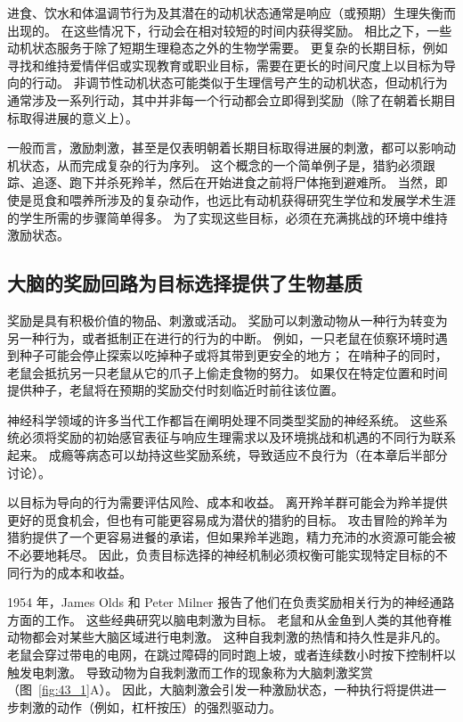 进食、饮水和体温调节行为及其潜在的动机状态通常是响应（或预期）生理失衡而出现的。
在这些情况下，行动会在相对较短的时间内获得奖励。
相比之下，一些动机状态服务于除了短期生理稳态之外的生物学需要。
更复杂的长期目标，例如寻找和维持爱情伴侣或实现教育或职业目标，需要在更长的时间尺度上以目标为导向的行动。
非调节性动机状态可能类似于生理信号产生的动机状态，但动机行为通常涉及一系列行动，其中并非每一个行动都会立即得到奖励（除了在朝着长期目标取得进展的意义上）。


一般而言，激励刺激，甚至是仅表明朝着长期目标取得进展的刺激，都可以影响动机状态，从而完成复杂的行为序列。
这个概念的一个简单例子是，猎豹必须跟踪、追逐、跑下并杀死羚羊，然后在开始进食之前将尸体拖到避难所。
当然，即使是觅食和喂养所涉及的复杂动作，也远比有动机获得研究生学位和发展学术生涯的学生所需的步骤简单得多。
为了实现这些目标，必须在充满挑战的环境中维持激励状态。



\subsection{大脑的奖励回路为目标选择提供了生物基质}

奖励是具有积极价值的物品、刺激或活动。
奖励可以刺激动物从一种行为转变为另一种行为，或者抵制正在进行的行为的中断。
例如，一只老鼠在侦察环境时遇到种子可能会停止探索以吃掉种子或将其带到更安全的地方；
在啃种子的同时，老鼠会抵抗另一只老鼠从它的爪子上偷走食物的努力。
如果仅在特定位置和时间提供种子，老鼠将在预期的奖励交付时刻临近时前往该位置。


神经科学领域的许多当代工作都旨在阐明处理不同类型奖励的神经系统。
这些系统必须将奖励的初始感官表征与响应生理需求以及环境挑战和机遇的不同行为联系起来。
成瘾等病态可以劫持这些奖励系统，导致适应不良行为（在本章后半部分讨论）。


以目标为导向的行为需要评估风险、成本和收益。
离开羚羊群可能会为羚羊提供更好的觅食机会，但也有可能更容易成为潜伏的猎豹的目标。
攻击冒险的羚羊为猎豹提供了一个更容易进餐的承诺，但如果羚羊逃跑，精力充沛的水资源可能会被不必要地耗尽。
因此，负责目标选择的神经机制必须权衡可能实现特定目标的不同行为的成本和收益。


1954 年，James Olds 和 Peter Milner 报告了他们在负责奖励相关行为的神经通路方面的工作。
这些经典研究以脑电刺激为目标。
老鼠和从金鱼到人类的其他脊椎动物都会对某些大脑区域进行电刺激。
这种自我刺激的热情和持久性是非凡的。
老鼠会穿过带电的电网，在跳过障碍的同时跑上坡，或者连续数小时按下控制杆以触发电刺激。
导致动物为自我刺激而工作的现象称为大脑刺激奖赏（图~\ref{fig:43_1}A）。
因此，大脑刺激会引发一种激励状态，一种执行将提供进一步刺激的动作（例如，杠杆按压）的强烈驱动力。


